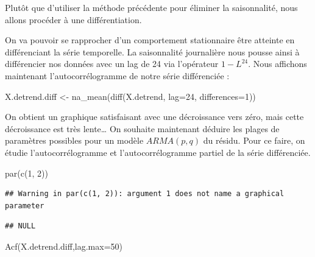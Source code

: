 \documentclass[
]{article}
\newenvironment{Shaded}{\begin{snugshade}}{\end{snugshade}}
\newcommand{\AttributeTok}[1]{\textcolor[rgb]{0.77,0.63,0.00}{#1}}
\newcommand{\DecValTok}[1]{\textcolor[rgb]{0.00,0.00,0.81}{#1}}
\newcommand{\FunctionTok}[1]{\textcolor[rgb]{0.00,0.00,0.00}{#1}}
\newcommand{\NormalTok}[1]{#1}
\newcommand{\OtherTok}[1]{\textcolor[rgb]{0.56,0.35,0.01}{#1}}
\begin{document}
Plutôt que d'utiliser la méthode précédente pour éliminer la
saisonnalité, nous allons procéder à une différentiation.

On va pouvoir se rapprocher d'un comportement stationnaire être atteinte
en différenciant la série temporelle. La saisonnalité journalière nous
pousse ainsi à différencier nos données avec un lag de 24 via
l'opérateur \(1-L^{24}\). Nous affichons maintenant l'autocorrélogramme
de notre série différenciée :

\begin{Shaded}
\begin{Highlighting}[]
\NormalTok{X.detrend.diff }\OtherTok{\textless{}{-}} \FunctionTok{na\_mean}\NormalTok{(}\FunctionTok{diff}\NormalTok{(X.detrend, }\AttributeTok{lag=}\DecValTok{24}\NormalTok{, }\AttributeTok{differences=}\DecValTok{1}\NormalTok{))}
\end{Highlighting}
\end{Shaded}

On obtient un graphique satisfaisant avec une décroissance vers zéro,
mais cette décroissance est très lente\ldots{} On souhaite maintenant
déduire les plages de paramètres possibles pour un modèle \(ARMA(p,q)\)
du résidu. Pour ce faire, on étudie l'autocorrélogramme et
l'autocorrélogramme partiel de la série différenciée.

\begin{Shaded}
\begin{Highlighting}[]
\FunctionTok{par}\NormalTok{(}\FunctionTok{c}\NormalTok{(}\DecValTok{1}\NormalTok{, }\DecValTok{2}\NormalTok{))}
\end{Highlighting}
\end{Shaded}

\begin{verbatim}
## Warning in par(c(1, 2)): argument 1 does not name a graphical parameter
\end{verbatim}

\begin{verbatim}
## NULL
\end{verbatim}

\begin{Shaded}
\begin{Highlighting}[]
\FunctionTok{Acf}\NormalTok{(X.detrend.diff,}\AttributeTok{lag.max=}\DecValTok{50}\NormalTok{)}
\end{Highlighting}
\end{Shaded}
\end{document}
